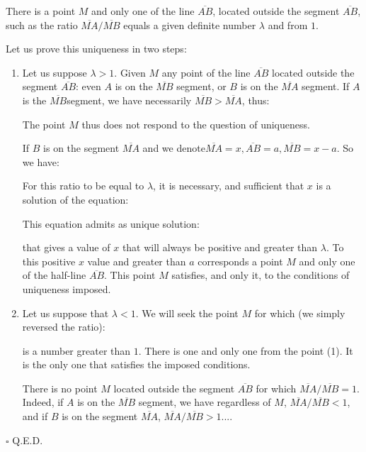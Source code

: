 	\begin{theorem}
	There is a point $M$ and only one of the line $\overline{AB}$, located outside the segment $\overline{AB}$, such as the ratio $\overline{MA}/\overline{MB}$  equals a given definite number $\lambda$ and from $1$.
	\end{theorem}
	\begin{dem} Let us prove this uniqueness in two steps:
	\begin{enumerate}
		\item Let us suppose $\lambda>1$. Given $M$ any point of the line $\overline{AB}$ located outside the segment $\overline{AB}$: even $A$ is on the $\overline{MB}$ segment, or $B$ is on the $\overline{MA}$ segment. If $A$ is the $\overline{MB}$segment, we have necessarily $\overline{MB}>\overline{MA}$, thus:
		
		The point $M$ thus does not respond to the question of uniqueness.
		
		If $B$ is on the segment $\overline{MA}$ and we denote$\overline{MA} = x, \overline{AB} = a, \overline{MB}=x-a$. So we have:
		
		For this ratio to be equal to $\lambda$, it is necessary, and sufficient that $x$ is a solution of the equation:
		
		This equation admits as unique solution:
		
		that gives a value of $x$ that will always be positive and greater than $\lambda$. To this positive $x$ value and greater than $a$ corresponds a point $M$ and only one of the half-line $\overline{AB}$. This point $M$ satisfies, and only it, to the conditions of uniqueness imposed.
		
		\item Let us suppose that $\lambda<1$. We will seek the point $M$ for which (we simply reversed the ratio):
		
		is a number greater than $1$. There is one and only one from the point (1). It is the only one that satisfies the imposed conditions.
	\begin{tcolorbox}[title=Remark,colframe=black,arc=10pt]
	There is no point $M$ located outside the segment $\overline{AB}$ for which $\overline{MA} / \overline{MB} = 1$. Indeed, if $A$ is on the $\overline{MB}$ segment, we have regardless of $M$, $\overline{MA}/\overline{MB}<1$, and if $B$ is on the segment $\overline{MA}$, $\overline{MA}/\overline{MB}>1$....
	\end{tcolorbox}
		
	\end{enumerate}
	\begin{flushright}
		$\square$  Q.E.D.
	\end{flushright}
	\end{dem}
	
